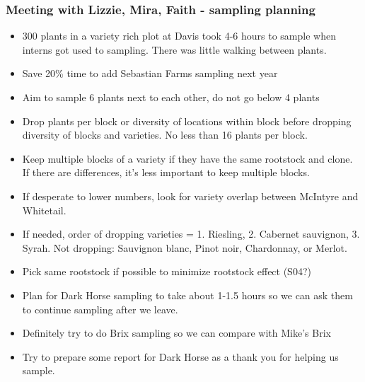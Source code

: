 \documentclass[11pt,letter]{article}
\newenvironment{smitemize}{
\begin{itemize}
  \setlength{\itemsep}{0pt}
  \setlength{\parskip}{0.8pt}
  \setlength{\parsep}{0pt}}
{\end{itemize}
}
\begin{document}
\subsubsection{Meeting with Lizzie, Mira, Faith - sampling planning}
\begin{smitemize}
\item 300 plants in a variety rich plot at Davis took 4-6 hours to sample when interns got used to sampling. There was little walking between plants.
\item Save 20\% time to add Sebastian Farms sampling next year
\item Aim to sample 6 plants next to each other, do not go below 4 plants
\item Drop plants per block or diversity of locations within block before dropping diversity of blocks and varieties. No less than 16 plants per block.
\item Keep multiple blocks of a variety if they have the same rootstock and clone. If there are differences, it's less important to keep multiple blocks.
\item If desperate to lower numbers, look for variety overlap between McIntyre and Whitetail. 
\item If needed, order of dropping varieties = 1. Riesling, 2. Cabernet sauvignon, 3. Syrah. Not dropping: Sauvignon blanc, Pinot noir, Chardonnay, or Merlot.
\item Pick same rootstock if possible to minimize rootstock effect (S04?)
\item Plan for Dark Horse sampling to take about 1-1.5 hours so we can ask them to continue sampling after we leave.
\item Definitely try to do Brix sampling so we can compare with Mike's Brix
\item Try to prepare some report for Dark Horse as a thank you for helping us sample.

\end{smitemize}
\end{document}
